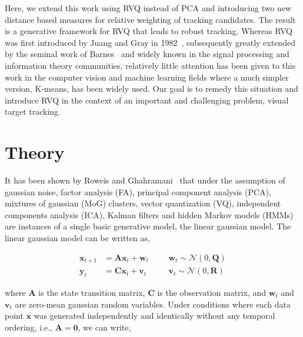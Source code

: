 Here, we extend this work using RVQ instead of PCA and introducing two new distance based measures for relative weighting of tracking candidates.  The result is a generative framework for RVQ that leads to robust tracking.  Whereas RVQ was first introduced by Juang and Gray in 1982~\cite{1982_CNF_SpeechRVQ_JuangGray}, subsequently greatly extended by the seminal work of Barnes~\cite{1991_CNF_DesignPerformanceRVQ_Frost,1992_JNL_RVQ_Barnes,1992_CNF_ImageCodingRVQ_Kossentini,1993_sigmaTrees_Barnes,1993_JNL_RVQDSC_Barnes,1995_JNL_OptimalityRVQ_Kossentini,1996_CNF_VQclassification_Barnes,1996_JNL_AdvancesRVQ_Barnes,2002_JNL_SigmaTrees_Barnes,2004_CNF_DSSAdataMining_Barnes,2007_JNL_Katrina_Barnes,2007_JNL_IDDM_Barnes} and widely known in the signal processing and information theory communities, relatively little attention has been given to this work in the computer vision and machine learning fields where a much simpler version, K-means, has been widely used.  Our goal is to remedy this situation and introduce RVQ in the context of an important and challenging problem, visual target tracking.


\section{Theory}
It has been shown by Roweis and Ghahramani~\cite{1999_JNL_Gaussian_roweis} that under the assumption of gaussian noise, factor analysis (FA), principal component analysis (PCA), mixtures of gaussian (MoG) clusters, vector quantization (VQ), independent components analysis (ICA), Kalman filters and hidden Markov models (HMMs) are instances of a single basic generative model, the linear gaussian model.  The linear gaussian model can be written as,

\begin{equation}
\begin{array}{llllllllllllll}
\mathbf{x}_{t+1} &=  \mathbf{A}\mathbf{x}_{t} +  \mathbf{w}_t   & & & \mathbf{w}_t \sim \mathcal{N}(0, \mathbf{Q})\\
\mathbf{y}_t 		 &=  \mathbf{C}\mathbf{x}_{t} +  \mathbf{v}_t    & & & \mathbf{v}_t \sim \mathcal{N}(0, \mathbf{R})
\end{array}
\label{LGM}
\end{equation}

where $\mathbf{A}$ is the state transition matrix, $\mathbf{C}$ is the observation matrix, and $\mathbf{w}_t$ and $\mathbf{v}_t$ are zero-mean gaussian random variables.  Under conditions where each data point $\mathbf{x}$ was generated independently and identically without any temporal ordering, i.e., $\mathbf{A}=\mathbf{0}$, we can write,

